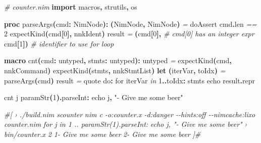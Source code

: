 \documentclass[
  12pt,
]{book}
\newenvironment{Shaded}{}{}
\newcommand{\CommentTok}[1]{\textcolor[rgb]{0.38,0.63,0.69}{\textit{#1}}}
\newcommand{\DataTypeTok}[1]{\textcolor[rgb]{0.56,0.13,0.00}{#1}}
\newcommand{\DecValTok}[1]{\textcolor[rgb]{0.25,0.63,0.44}{#1}}
\newcommand{\KeywordTok}[1]{\textcolor[rgb]{0.00,0.44,0.13}{\textbf{#1}}}
\newcommand{\NormalTok}[1]{#1}
\newcommand{\OtherTok}[1]{\textcolor[rgb]{0.00,0.44,0.13}{#1}}
\newcommand{\StringTok}[1]{\textcolor[rgb]{0.25,0.44,0.63}{#1}}
\begin{document}
\begin{Shaded}
\begin{Highlighting}[]
\CommentTok{\# counter.nim}
\KeywordTok{import}\NormalTok{ macros}\KeywordTok{,}\NormalTok{ strutils}\KeywordTok{,}\NormalTok{ os}

\KeywordTok{proc }\StringTok{parseArgs}\KeywordTok{(}\NormalTok{cmd}\KeywordTok{:} \DataTypeTok{NimNode}\KeywordTok{):} \KeywordTok{(}\DataTypeTok{NimNode}\KeywordTok{,} \DataTypeTok{NimNode}\KeywordTok{)} \CommentTok{=}
  \DataTypeTok{doAssert}\NormalTok{ cmd}\KeywordTok{.}\DataTypeTok{len} \CommentTok{==} \DecValTok{2}
  \DataTypeTok{expectKind}\KeywordTok{(}\NormalTok{cmd}\KeywordTok{[}\DecValTok{0}\KeywordTok{],}\NormalTok{ nnkIdent}\KeywordTok{)}
  \OtherTok{result} \CommentTok{=} \KeywordTok{(}\DataTypeTok{cmd}\KeywordTok{[}\DecValTok{0}\KeywordTok{],} \CommentTok{\# cmd[0] has an integer expr}
\NormalTok{            cmd}\KeywordTok{[}\DecValTok{1}\KeywordTok{])} \CommentTok{\# identifier to use for loop}

\KeywordTok{macro }\StringTok{cnt}\KeywordTok{(}\NormalTok{cmd}\KeywordTok{:} \DataTypeTok{untyped}\KeywordTok{,}\NormalTok{ stmts}\KeywordTok{:} \DataTypeTok{untyped}\KeywordTok{):} \DataTypeTok{untyped} \CommentTok{=}
  \DataTypeTok{expectKind}\KeywordTok{(}\NormalTok{cmd}\KeywordTok{,}\NormalTok{ nnkCommand}\KeywordTok{)}
  \DataTypeTok{expectKind}\KeywordTok{(}\NormalTok{stmts}\KeywordTok{,}\NormalTok{ nnkStmtList}\KeywordTok{)}
  \KeywordTok{let} \KeywordTok{(}\NormalTok{iterVar}\KeywordTok{,}\NormalTok{ toIdx}\KeywordTok{)} \CommentTok{=} \DataTypeTok{parseArgs}\KeywordTok{(}\NormalTok{cmd}\KeywordTok{)}
  \OtherTok{result} \CommentTok{=} \DataTypeTok{quote} \DataTypeTok{do}\KeywordTok{:}
    \DataTypeTok{for}\NormalTok{ \textasciigrave{}iterVar\textasciigrave{} }\CommentTok{in} \DecValTok{1}\KeywordTok{..}\NormalTok{\textasciigrave{}toIdx\textasciigrave{}}\KeywordTok{:}
\NormalTok{      \textasciigrave{}stmts\textasciigrave{}}
  \DataTypeTok{echo} \OtherTok{result}\KeywordTok{.}\DataTypeTok{repr}

\DataTypeTok{cnt} \DataTypeTok{j} \DataTypeTok{paramStr}\KeywordTok{(}\DecValTok{1}\KeywordTok{).}\DataTypeTok{parseInt}\KeywordTok{:}
    \DataTypeTok{echo}\NormalTok{ j}\KeywordTok{,} \StringTok{"{-} Give me some beer"}

\CommentTok{\#[ › ./build.nim scounter}
\CommentTok{   nim c {-}o:counter.x {-}d:danger {-}{-}hints:off {-}{-}nimcache:lixo counter.nim}
\CommentTok{   for j in 1 .. paramStr(1).parseInt:}
\CommentTok{       echo j, "{-} Give me some beer"}
\CommentTok{   › bin/counter.x 2}
\CommentTok{   1{-} Give me some beer}
\CommentTok{   2{-} Give me some beer}
\CommentTok{]\#}
\end{Highlighting}
\end{Shaded}
\end{document}
